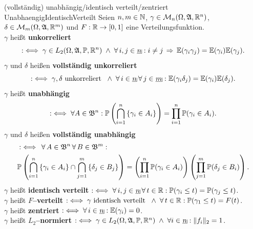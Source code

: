 \begin{definition}{(vollst\"andig) unabhängig/identisch verteilt/zentriert}
                  {UnabhaengigIdentischVerteilt}
Seien $n, m \in \mathbb{N}$, $\gamma \in \mathcal{M}_n(\Omega, \mathfrak{A}, \mathbb{R}^n)$,
$\delta \in \mathcal{M}_m(\Omega, \mathfrak{A}, \mathbb{R}^m)$ und $F: \mathbb{R} \rightarrow [0, 1]$ eine
Verteilungsfunktion.\\
$\gamma$ heißt \textbf{unkorreliert}
\[: \iff \gamma \in L_2(\Omega, \mfa, \Prim, \R^n) \; \wedge \;
    \forall\, i, j \in \haken n: i \neq j \folgt \E(\gamma_i\gamma_j)
  = \E(\gamma_i)\E(\gamma_j)\text.\]
$\gamma$ und $\delta$ heißen \textbf{vollständig unkorreliert}
\[:\iff \gamma, \delta \text{ unkorreliert } \; \wedge \;
        \forall\, i \in \haken n\, \forall\, j \in \haken m:
        \E(\gamma_i\delta_j)= \E(\gamma_i)\E(\delta_j)\text.\]
$\gamma$ heißt \textbf{unabhängig}
\[:\iff \forall A \in \mathfrak B^n: 
\mathbb{P}\left(\bigcap_{i=1}^n \left\{\gamma_i\in A_i\right\}\right)
=\prod_{i=1}^n \mathbb{P}(\gamma_i\in A_i)\text.\]
$\gamma$ und $\delta$ heißen \textbf{vollständig unabhängig}
\begin{align*}
&:\iff \,
\forall\, A\in \mathfrak{B}^n\, \forall\, B\in \mathfrak{B}^m:\\
& \mathbb{P}\left(\bigcap_{i=1}^n \left\{\gamma_i \in A_i\right\} \cap 
\bigcap_{j=1}^m \left\{\delta_j \in B_j\right\} \right)
= \left(\prod_{i=1}^n \mathbb{P}(\gamma_i\in A_i)\right)
\left(\prod_{j=1}^m \mathbb{P}(\delta_j\in B_i)\right)\text.
\end{align*}
$\gamma$ heißt \textbf{identisch verteilt}
$: \iff \forall \, i, j \in \haken n\, \forall \, t \in \R:
    \Prim(\gamma_i \le t) = \Prim(\gamma_j \le t)$.\\
$\gamma$ heißt \textbf{$F$--verteilt}
$:\iff \gamma \text{ identisch verteilt } \; \wedge \;
 \forall \, t \in \mathbb{R}: \mathbb{P}(\gamma_1 \le t) = F(t)$.\\
$\gamma$ heißt \textbf{zentriert}
$:\iff \forall\, i \in \haken n: \E(\gamma_i) = 0$.\\
$\gamma$ heißt \textbf{$L_2$--normiert}
$:\iff \gamma \in L_2(\Omega, \mfa, \Prim, \R^n) \; \wedge \;
   \forall i \in \haken n: \norm{f_i}_2 = 1$.
\end{definition}